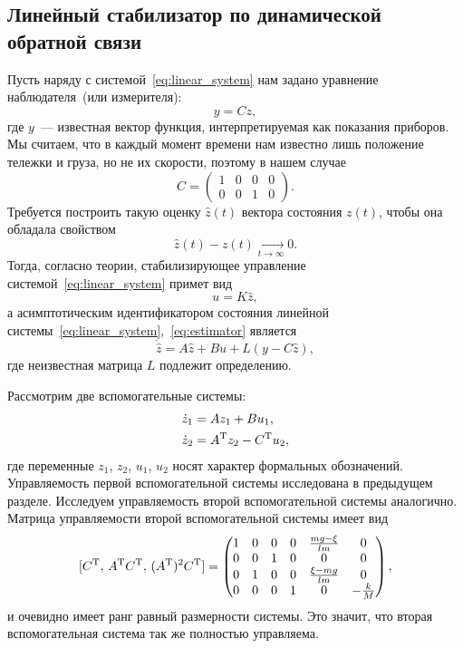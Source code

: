 \subsection{Линейный стабилизатор по динамической обратной связи}

Пусть наряду с системой~\eqref{eq:linear_system} нам задано уравнение наблюдателя~(или измерителя):
\begin{equation}\label{eq:estimator}
	y = Cz,
\end{equation}
где $y$~--- известная вектор функция, интерпретируемая как показания приборов.
Мы считаем, что в каждый момент времени нам известно лишь положение тележки и груза, но не их скорости, поэтому в нашем случае
$$
	C = \begin{pmatrix}
		1 & 0 & 0 & 0 \\
		0 & 0 & 1 & 0
	\end{pmatrix}.
$$
Требуется построить такую оценку $\hat z(t)$ вектора состояния $z(t)$, чтобы она обладала свойством
$$
	\hat z(t) - z(t) \xrightarrow[t \to \infty]{} 0.
$$
Тогда, согласно теории, стабилизирующее управление системой~\eqref{eq:linear_system} примет вид
$$
	u = K \hat z,
$$
а асимптотическим идентификатором состояния линейной системы~\eqref{eq:linear_system},~\eqref{eq:estimator} является
$$
	\dot{\hat z} = A \hat z + B u + L(y - C \hat z),
$$
где неизвестная матрица $L$ подлежит определению.

Рассмотрим две вспомогательные системы:
\begin{equation}
	\begin{aligned}
\dot z_1 &= A z_1 + B u_1,
\\
\dot z_2 &= A^\mathrm{T} z_2 - C^\mathrm{T} u_2,
	\end{aligned}
\end{equation}
где переменные $z_1$, $z_2$, $u_1$, $u_2$ носят характер формальных обозначений.
Управляемость первой вспомогательной системы исследована в предыдущем разделе.
Исследуем управляемость второй  вспомогательной системы аналогично.
Матрица управляемости второй вспомогательной системы имеет вид
$$
	[C^\mathrm{T},\,A^\mathrm{T} C^\mathrm{T},\, (A^\mathrm{T})^2 C^\mathrm{T}] = 
	\begin{pmatrix}
		1 & 0 & 0 & 0 & \frac{mg - \xi}{lm} & 0
		\\
		0 & 0 & 1 & 0 & 0 & 0
		\\
		0 & 1 & 0 & 0 & \frac{\xi - mg}{lm} & 0
		\\
		0 & 0 & 0 & 1 & 0 & -\frac{k}{M}
	\end{pmatrix},
$$
и очевидно имеет ранг равный размерности системы. Это значит, что вторая вспомогательная система так же полностью управляема.

